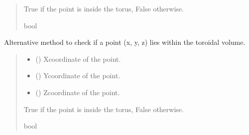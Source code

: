 \documentclass[letterpaper,10pt,english]{sphinxmanual}
\begin{document}
\begin{fulllineitems}
\begin{fulllineitems}
\begin{quote}
\begin{description}
\begin{itemize}
\end{itemize}

\sphinxAtStartPar
True if the point is inside the torus, False otherwise.

\sphinxAtStartPar
bool

\end{description}\end{quote}

\end{fulllineitems}


\begin{fulllineitems}
\label{\detokenize{src:src.Torus.Torus.contains_point2}}
\pysigstartsignatures
{}
\pysigstopsignatures
\sphinxAtStartPar
Alternative method to check if a point (x, y, z) lies within the toroidal volume.
\begin{quote}\begin{description}
\begin{itemize}
\item {} 
\sphinxAtStartPar
{} () \textendash{} X\sphinxhyphen{}coordinate of the point.

\item {} 
\sphinxAtStartPar
{} () \textendash{} Y\sphinxhyphen{}coordinate of the point.

\item {} 
\sphinxAtStartPar
{} () \textendash{} Z\sphinxhyphen{}coordinate of the point.

\end{itemize}

\sphinxAtStartPar
True if the point is inside the torus, False otherwise.

\sphinxAtStartPar
bool

\end{description}\end{quote}


\end{fulllineitems}
\end{fulllineitems}
\end{document}
